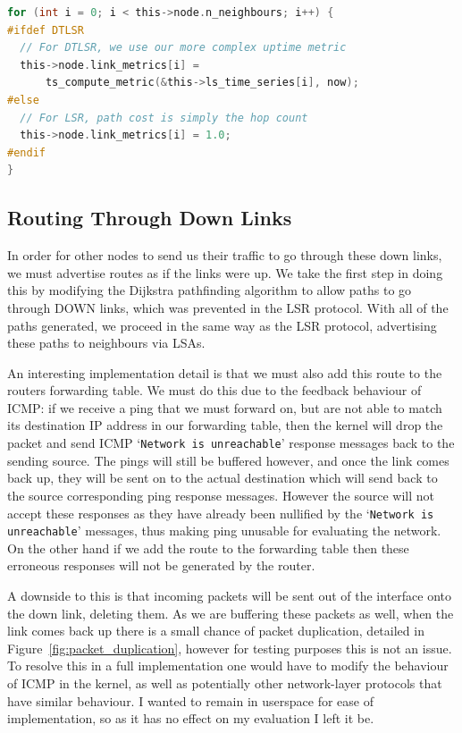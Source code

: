 \documentclass[withindex,glossary,openany]{cam-thesis}
\begin{document}
\begin{minipage}{1\textwidth} \centering
\begin{lstlisting}[language=C, label=preprocessor_switch, frame=tb, caption=Example of preprocessor switch for DTLSR modifications; the choice of link metric differs in LSR and DTLSR.]
for (int i = 0; i < this->node.n_neighbours; i++) {
#ifdef DTLSR
  // For DTLSR, we use our more complex uptime metric
  this->node.link_metrics[i] =
      ts_compute_metric(&this->ls_time_series[i], now);
#else
  // For LSR, path cost is simply the hop count
  this->node.link_metrics[i] = 1.0;
#endif
}
\end{lstlisting}
\end{minipage}

\subsection{Routing Through Down Links}

In order for other nodes to send us their traffic to go through these down links, we must advertise routes as if the links were up. We take the first step in doing this by modifying the Dijkstra pathfinding algorithm to allow paths to go through DOWN links, which was prevented in the LSR protocol. With all of the paths generated, we proceed in the same way as the LSR protocol, advertising these paths to neighbours via LSAs.

An interesting implementation detail is that we must also add this route to the routers forwarding table. We must do this due to the feedback behaviour of ICMP: if we receive a ping that we must forward on, but are not able to match its destination IP address in our forwarding table, then the kernel will drop the packet and send ICMP `\texttt{Network is unreachable}' response messages back to the sending source. The pings will still be buffered however, and once the link comes back up, they will be sent on to the actual destination which will send back to the source corresponding ping response messages. However the source will not accept these responses as they have already been nullified by the `\texttt{Network is unreachable}' messages, thus making ping unusable for evaluating the network. On the other hand if we add the route to the forwarding table then these erroneous responses will not be generated by the router.

A downside to this is that incoming packets will be sent out of the interface onto the down link, deleting them. As we are buffering these packets as well, when the link comes back up there is a small chance of packet duplication, detailed in Figure~\ref{fig:packet_duplication}, however for testing purposes this is not an issue. To resolve this in a full implementation one would have to modify the behaviour of ICMP in the kernel, as well as potentially other network-layer protocols that have similar behaviour. I wanted to remain in userspace for ease of implementation, so as it has no effect on my evaluation I left it be.
\end{document}
